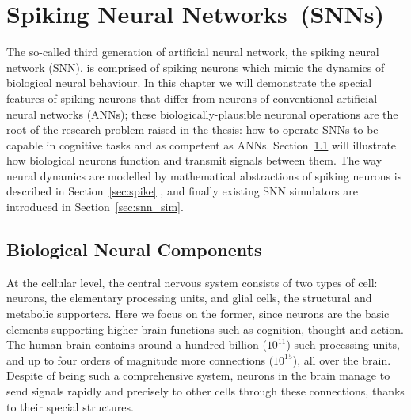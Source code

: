 \chapter{Spiking Neural Networks~(SNNs)}
\label{cha:bkg}
The so-called third generation of artificial neural network, the spiking neural network (SNN), is comprised of spiking neurons which mimic the dynamics of biological neural behaviour.
In this chapter we will demonstrate the special features of spiking neurons that differ from neurons of conventional artificial neural networks (ANNs);
these biologically-plausible neuronal operations are the root of the research problem raised in the thesis: how to operate SNNs to be capable in cognitive tasks and as competent as ANNs.
Section~\ref{sec:bio_neuron} will illustrate how biological neurons function and transmit signals between them.
The way neural dynamics are modelled by mathematical abstractions of spiking neurons is described in Section~\ref{sec:spike} , and finally existing SNN simulators are introduced in Section~\ref{sec:snn_sim}.

\section{Biological Neural Components}
\label{sec:bio_neuron}
At the cellular level, the central nervous system consists of two types of cell: neurons, the elementary processing units, and glial cells, the structural and metabolic supporters. 
Here we focus on the former, since neurons are the basic elements supporting higher brain functions such as cognition, thought and action. %
The human brain contains around a hundred billion ($10^{11}$) such processing units, and up to four orders of magnitude more connections ($10^{15}$), all over the brain.
Despite of being such a comprehensive system, neurons in the brain manage to send signals rapidly and precisely to other cells through these connections, thanks to their special structures.
